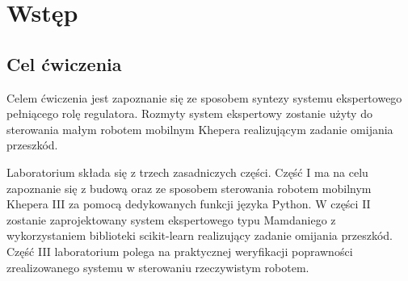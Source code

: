 \section{Wstęp}\label{sec:wstep}
\subsection{Cel ćwiczenia}\label{subsec:cel}

Celem ćwiczenia jest zapoznanie się ze sposobem syntezy systemu ekspertowego pełniącego rolę regulatora. Rozmyty system ekspertowy zostanie użyty do sterowania małym robotem mobilnym Khepera realizującym zadanie omijania przeszkód. 

Laboratorium składa się z trzech zasadniczych części. Część I ma na celu zapoznanie się z budową oraz ze sposobem sterowania robotem mobilnym Khepera III za pomocą dedykowanych funkcji języka Python. W części II zostanie zaprojektowany system ekspertowego typu Mamdaniego z wykorzystaniem biblioteki scikit-learn realizujący zadanie omijania przeszkód. Część III laboratorium polega na praktycznej weryfikacji poprawności zrealizowanego systemu w sterowaniu rzeczywistym robotem.
